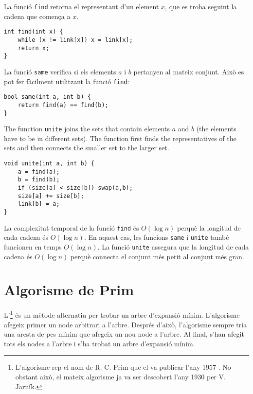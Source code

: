 La funció \texttt{find} retorna el representant d'un element $x$, que
es troba seguint la cadena que comença a $x$.


\begin{lstlisting}
int find(int x) {
    while (x != link[x]) x = link[x];
    return x;
}
\end{lstlisting}


La funció \texttt{same} verifica si els elements $a$ i $b$ pertanyen
al mateix conjunt. Això es pot fer fàcilment utilitzant la funció
\texttt{find}:


\begin{lstlisting}
bool same(int a, int b) {
    return find(a) == find(b);
}
\end{lstlisting}



\begin{samepage}
The function \texttt{unite} joins the sets
that contain elements $a$ and $b$
(the elements have to be in different sets).
The function first finds the representatives
of the sets and then connects the smaller
set to the larger set.

\begin{lstlisting}
void unite(int a, int b) {
    a = find(a);
    b = find(b);
    if (size[a] < size[b]) swap(a,b);
    size[a] += size[b];
    link[b] = a;
}
\end{lstlisting}
\end{samepage}


La complexitat temporal de la funció \texttt{find} és $O(\log n)$
perquè la longitud de cada cadena és $O(\log n)$. En aquest cas, les
funcions \texttt{same} i \texttt{unite} també funcionen en temps
$O(\log n)$. La funció \texttt{unite} assegura que la longitud de cada
cadena és $O(\log n)$ perquè connecta el conjunt més petit al conjunt
més gran.

\section{Algorisme de Prim}


L'\footnote{L'algorisme rep el nom de
R. C. Prim que el va publicar l'any 1957 \cite{pri57}. No obstant
això, el mateix algorisme ja va ser descobert l'any 1930 per
V. Jarník.} és un mètode alternatiu per trobar un arbre d'expansió
mínim. L'algorisme afegeix primer un node arbitrari a l'arbre. Després
d'això, l'algorisme sempre tria una aresta de pes mínim que afegeix un
nou node a l'arbre. Al final, s'han afegit tots els nodes a l'arbre i
s'ha trobat un arbre d'expansió mínim.

